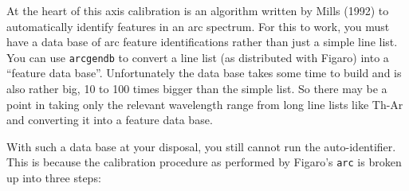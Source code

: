 \documentclass[11pt,twoside]{article}
\newcommand{\htmlref}[2]{#1}
\newcommand{\xref}[3]{#1}
\begin{document}
   At the heart of this axis calibration is an algorithm written by
\htmlref{Mills (1992)}{refer}
   to automatically identify features in an arc spectrum.  For this to
   work, you must have a data base of arc feature identifications rather
   than just a simple line list.  You can use
{\tt\htmlref{arcgendb}{ARCGENDB}}
   to convert a
\xref{line list (as distributed with Figaro)}{sun86}{arc_documentation}
   into a ``feature data base''.  Unfortunately the data base takes some
   time to build and is also rather big, 10 to 100 times bigger than
   the simple list.  So there may be a point in taking only the relevant
   wavelength range from long line lists like Th-Ar and converting it into
   a feature data base.

   With such a data base at your disposal, you still cannot run the
   auto-identifier.  This is because the calibration procedure as
   performed by Figaro's
{\tt\xref{arc}{sun86}{ARC}}
   is broken up into three steps:
\end{document}
